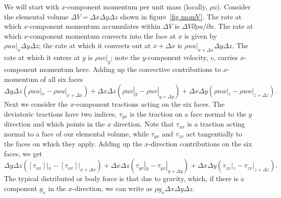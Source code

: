 \documentclass[twoside,11pt]		{report}
\begin{document}
We will start with $x$-component momentum per unit mass (locally,
$\rho u$).  Consider the elemental volume $\Delta V=\Delta x\Delta
y\Delta z$ shown in figure~\ref{fig.momV}. The rate at which
$x$-component momentum accumulates within $\Delta V$ is $\Delta
V\partial \rho u/\partial x$. The rate at which $x$-component momentum
convects into the face at $x$ is given by $\rho uu|_{x}\Delta y\Delta
z$; the rate at which it convects out at $x+\Delta x$ is $\rho
uu|_{x+\Delta x}\Delta y\Delta z$. The rate at which it enters at $y$
is $\rho uv|_y$; note the $y$-component velocity, $v$, carries
$x$-component momentum here. Adding up the convective contributions to
$x$-momentum of all six faces
\begin{equation}
\Delta y\Delta z(\rho uu|_x-\rho uu|_{x+\Delta x})+\Delta x\Delta
z(\rho uv|_y-\rho uv|_{y+\Delta y})+\Delta x\Delta y(\rho uw|_z-\rho
uw|_{z+\Delta z}).
\end{equation}
Next we consider the $x$-component tractions acting on the six
faces. The deviatoric tractions have two indices, \eg $\tau_{yx}$ is
the traction on a face normal to the $y$ direction and which points in
the $x$ direction. Note that $\tau_{xx}$ is a traction acting normal
to a face of our elemental volume, while $\tau_{yx}$ and $\tau_{zx}$
act tangentially to the faces on which they apply. Adding up the
$x$-direction contributions on the six faces, we get
\begin{equation}
\Delta y\Delta z([\tau_{xx}]|_x-[\tau_{xx}]|_{x+\Delta x})+\Delta x\Delta
z(\tau_{yx}|_y-\tau_{yx}|_{y+\Delta y})+\Delta x\Delta
y(\tau_{zx}|_z-\tau_{zx}|_{z+\Delta z}).
\end{equation}
The typical distributed or body force is that due to gravity, which,
if there is a component $g_x$ in the $x$-direction, we can write as
$\rho g_x \Delta x\Delta y\Delta z$.
\end{document}
